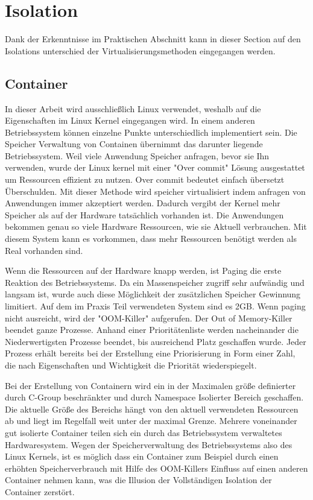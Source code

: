 \thispagestyle{empty}
\section{Isolation}
Dank der Erkenntnisse im Praktischen Abschnitt kann in dieser Section auf den Isolations unterschied der Virtualisierungsmethoden eingegangen werden.

\subsection{Container}
In dieser Arbeit wird ausschließlich Linux verwendet, weshalb auf die Eigenschaften im Linux Kernel eingegangen wird. In einem anderen Betriebssystem können einzelne Punkte unterschiedlich implementiert sein. Die Speicher Verwaltung von Containen übernimmt das darunter liegende Betriebssystem. Weil viele Anwendung Speicher anfragen, bevor sie Ihn verwenden, wurde der Linux kernel mit einer "Over commit" Lösung ausgestattet um Ressourcen effizient zu nutzen. Over commit bedeutet einfach übersetzt Überschulden. Mit dieser Methode wird speicher virtualisiert indem anfragen von Anwendungen immer akzeptiert werden. Dadurch vergibt der Kernel mehr Speicher als auf der Hardware tatsächlich vorhanden ist. Die Anwendungen bekommen genau so viele Hardware Ressourcen, wie sie Aktuell verbrauchen. Mit diesem System kann es vorkommen, dass mehr Ressourcen benötigt werden als Real vorhanden sind. 

Wenn die Ressourcen auf der Hardware knapp werden, ist Paging die erste Reaktion des Betriebssystems. Da ein Massenspeicher zugriff sehr aufwändig und langsam ist, wurde auch diese Möglichkeit der zusätzlichen Speicher Gewinnung limitiert. Auf dem im Praxis Teil verwendeten System sind es 2GB. Wenn paging nicht ausreicht, wird der "OOM-Killer" aufgerufen. Der Out of Memory-Killer beendet ganze Prozesse. Anhand einer Prioritätenliste werden nacheinander die Niederwertigsten Prozesse beendet, bis ausreichend Platz geschaffen wurde. Jeder Prozess erhält bereits bei der Erstellung eine Priorisierung in Form einer Zahl, die nach Eigenschaften und Wichtigkeit die Priorität wiederspiegelt.

Bei der Erstellung von Containern wird ein in der Maximalen größe definierter durch C-Group beschränkter und durch Namespace Isolierter Bereich geschaffen. Die aktuelle Größe des Bereichs hängt von den aktuell verwendeten Ressourcen ab und liegt im Regelfall weit unter der maximal Grenze. Mehrere voneinander gut isolierte Container teilen sich ein durch das Betriebssystem verwaltetes Hardwaresystem. Wegen der Speicherverwaltung des Betriebssystems also des Linux Kernels, ist es möglich dass ein Container zum Beispiel durch einen erhöhten Speicherverbrauch mit Hilfe des OOM-Killers Einfluss auf einen anderen Container nehmen kann, was die Illusion der Vollständigen Isolation der Container zerstört.



